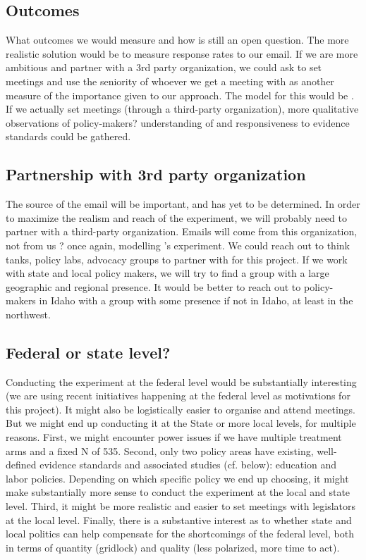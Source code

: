 \documentclass[12pt,final,fleqn]{article}
\theoremstyle{plain}
\begin{document}
\subsection{Outcomes} \label{sec: Outcomes}
What outcomes we would measure and how is still an open question. The more realistic solution would be to measure response rates to our email. If we are more ambitious and partner with a 3rd party organization, we could ask to set meetings and use the seniority of whoever we get a meeting with as another measure of the importance given to our approach. The model for this would be \citet{kalla2016campaign}. If we actually set meetings (through a third-party organization), more qualitative observations of policy-makers? understanding of and responsiveness to evidence standards could be gathered. 

\subsection{Partnership with 3rd party organization} \label{sec: Partnership}

The source of the email will be important, and has yet to be determined. In order to maximize the realism and reach of the experiment, we will probably need to partner with a third-party organization. Emails will come from this organization, not from us ? once again, modelling \citet{kalla2016campaign}'s experiment. We could reach out to think tanks, policy labs, advocacy groups to partner with for this project. If we work with state and local policy makers, we will try to find a group with a large geographic and regional presence. It would be better to reach out to policy-makers in Idaho with a group with some presence if not in Idaho, at least in the northwest. 

\subsection{Federal or state level?} \label{sec: Level}

Conducting the experiment at the federal level would be substantially interesting (we are using recent initiatives happening at the federal level as motivations for this project). It might also be logistically easier to organise and attend meetings. But we might end up conducting it at the State or more local levels, for multiple reasons. First, we might encounter power issues if we have multiple treatment arms and a fixed N of 535. Second, only two policy areas have existing, well-defined evidence standards and associated studies (cf. below): education and labor policies. Depending on which specific policy we end up choosing, it might make substantially more sense to conduct the experiment at the local and state level. Third, it might be more realistic and easier to set meetings with legislators at the local level. Finally, there is a substantive interest as to whether state and local politics can help compensate for the shortcomings of the federal level, both in terms of quantity (gridlock) and quality (less polarized, more time to act). 
\end{document}
